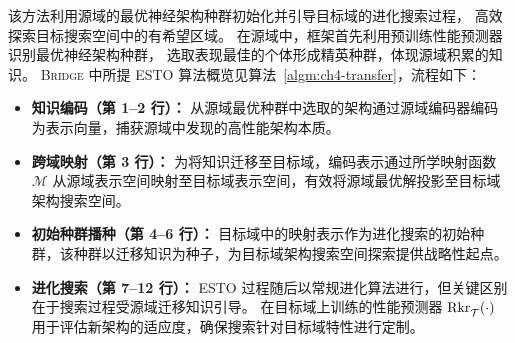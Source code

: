 \documentclass[../main.tex]{subfiles}
\begin{document}
该方法利用源域的最优神经架构种群初始化并引导目标域的进化搜索过程，
高效探索目标搜索空间中的有希望区域。
在源域中，框架首先利用预训练性能预测器识别最优神经架构种群，
选取表现最佳的个体形成精英种群，体现源域积累的知识。
\textsc{Bridge} 中所提 ESTO 算法概览见算法~\ref{algm:ch4-transfer}，流程如下：
\begin{itemize}[leftmargin=3\ccwd]
	\item \textbf{知识编码（第 1–2 行）：} 从源域最优种群中选取的架构通过源域编码器编码为表示向量，捕获源域中发现的高性能架构本质。
	\item \textbf{跨域映射（第 3 行）：} 为将知识迁移至目标域，编码表示通过所学映射函数 $ \mathcal{M} $ 从源域表示空间映射至目标域表示空间，有效将源域最优解投影至目标域架构搜索空间。
	\item \textbf{初始种群播种（第 4–6 行）：} 目标域中的映射表示作为进化搜索的初始种群，该种群以迁移知识为种子，为目标域架构搜索空间探索提供战略性起点。
	\item \textbf{进化搜索（第 7–12 行）：} ESTO 过程随后以常规进化算法进行，但关键区别在于搜索过程受源域迁移知识引导。
	      在目标域上训练的性能预测器 $ \mathrm{Rkr}^{\mathstrut}_{\mathcal{T}}(\cdot) $ 用于评估新架构的适应度，确保搜索针对目标域特性进行定制。
\end{itemize}
\end{document}
